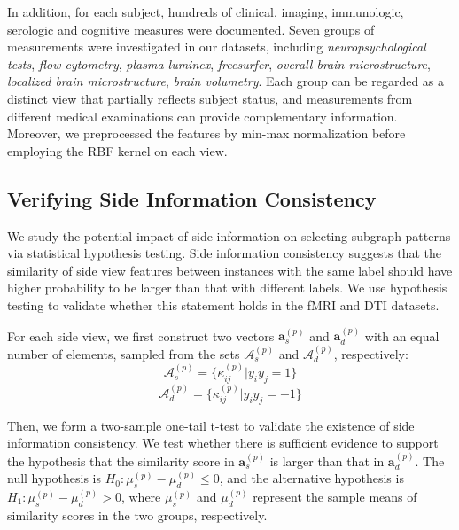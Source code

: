 \documentclass[conference]{IEEEtran}
\newcommand{\neu}[0]{\emph{neuropsychological tests}}
\newcommand{\flo}[0]{\emph{flow cytometry}}
\newcommand{\pla}[0]{\emph{plasma luminex}}
\newcommand{\fre}[0]{\emph{freesurfer}}
\newcommand{\ave}[0]{\emph{overall brain microstructure}}
\newcommand{\dti}[0]{\emph{localized brain microstructure}}
\newcommand{\seg}[0]{\emph{brain volumetry}}
\begin{document}
In addition, for each subject, hundreds of clinical, imaging, immunologic, serologic and cognitive measures were documented. Seven groups of measurements were investigated in our datasets, including {\neu}, {\flo}, {\pla}, {\fre}, {\ave}, {\dti}, {\seg}. Each group can be regarded as a distinct view that partially reflects subject status, and measurements from different medical examinations can provide complementary information. Moreover, we preprocessed the features by min-max normalization before employing the RBF kernel on each view.

\subsection{Verifying Side Information Consistency}\label{sec:ttest}

We study the potential impact of side information on selecting subgraph patterns via statistical hypothesis testing. Side information consistency suggests that the similarity of side view features between instances with the same label should have higher probability to be larger than that with different labels. We use hypothesis testing to validate whether this statement holds in the fMRI and DTI datasets.

For each side view, we first construct two vectors $\mathbf{a}_s^{(p)}$ and $\mathbf{a}_d^{(p)}$ with an equal number of elements, sampled from the sets $\mathcal{A}_s^{(p)}$ and $\mathcal{A}_d^{(p)}$, respectively:
\begin{equation}
\mathcal{A}_s^{(p)}=\{\kappa^{(p)}_{ij}|y_iy_j=1\}
\label{eq:a_s}
\end{equation}\vspace{-15pt}\begin{equation}
\mathcal{A}_d^{(p)}=\{\kappa^{(p)}_{ij}|y_iy_j=-1\}
\label{eq:a_d}
\end{equation}

Then, we form a two-sample one-tail t-test to validate the existence of side information consistency. We test whether there is sufficient evidence to support the hypothesis that the similarity score in $\mathbf{a}_s^{(p)}$ is larger than that in $\mathbf{a}_d^{(p)}$. The null hypothesis is $H_0: \mu_s^{(p)}-\mu_d^{(p)}\leq0$, and the alternative hypothesis is $H_1: \mu_s^{(p)}-\mu_d^{(p)}>0$, where $\mu_s^{(p)}$ and $\mu_d^{(p)}$ represent the sample means of similarity scores in the two groups, respectively.
\end{document}
